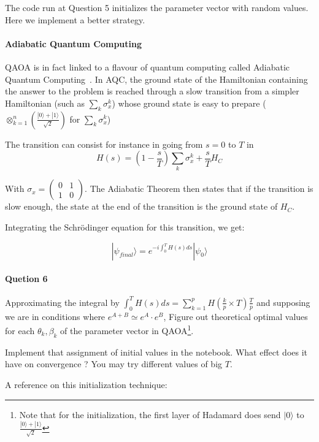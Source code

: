 \documentclass{article}
\begin{document}
The code run at Question 5 initializes the parameter vector with random values. Here we implement a better strategy.

\paragraph{Adiabatic Quantum Computing} QAOA is in fact linked to a flavour of quantum computing called Adiabatic 
Quantum Computing~\cite{albash2018adiabatic}. In AQC, the ground state of the Hamiltonian containing the answer to the problem
is reached through a slow transition from a simpler Hamiltonian (such as $\sum_k \sigma_x^k$) whose
ground state is easy to prepare ($\otimes_{k=1}^n\left(\frac{|0\rangle+|1\rangle}{\sqrt{2}}\right)$ for $\sum_k \sigma_x^k$)

The transition can consist for instance in going from $s=0$ to $T$ in $$ H(s) = (1-\frac{s}{T})\sum_k \sigma_x^k + \frac{s}{T} H_C $$

With $\sigma_x = \begin{pmatrix} 0 & 1\\ 1 & 0 \end{pmatrix}$.
The Adiabatic Theorem then states that if the transition is slow enough, the state at the end of the transition is the
ground state of $H_C$.

Integrating the Schr\"{o}dinger equation for this transition, we get:

$$ |\psi_{final}\rangle = e^{-i\int_0^T H(s)ds }|\psi_0\rangle $$

\paragraph{Quetion 6} Approximating the integral by $\int_0^T H(s)ds = \sum_{k=1}^p H(\frac{k}{p}\times T)\frac{T}{p}$ 
and supposing we are in conditions where $e^{A+B}\simeq e^A\cdot e^B$, Figure out theoretical optimal values for each $\theta_k,\beta_k$
of the parameter vector in QAOA\footnote{Note that for the initialization, the first layer of Hadamard does send $|0\rangle$
to $\frac{|0\rangle+|1\rangle}{\sqrt{2}}$}.

Implement that assignment of initial values in the notebook. What effect does it have on convergence ? You may try different values
of big $T$. 

A reference on this initialization technique:~\cite{sack2021quantum} 



\end{document}
